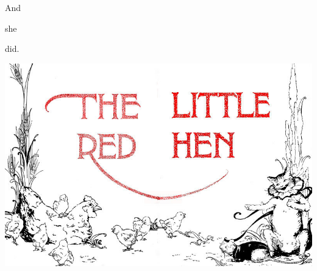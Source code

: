 \documentclass[letterpaper, 10pt, openany]{memoir}
\begin{document}
And

\vspace{4\onelineskip}

\indent\hspace{0.5cm} she

\vspace{4\onelineskip}

\indent\hspace{1cm} did.

\newpage
\begin{center}
	\includegraphics[width=\textwidth]{image_044.jpg}
\end{center}
\end{document}
